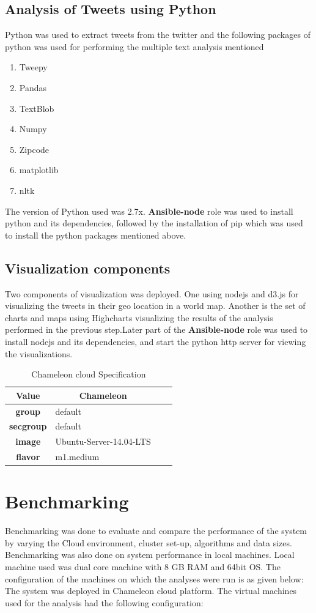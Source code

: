 \documentclass[9pt,twocolumn,twoside]{../../styles/osajnl}
\begin{document}
\subsection{Analysis of Tweets using Python}
Python was used to extract tweets from the twitter and the following packages of python was used for performing the multiple text analysis mentioned
\begin{enumerate}
    \item Tweepy
\item Pandas
\item TextBlob
\item Numpy
\item Zipcode
\item matplotlib
\item nltk
\end{enumerate}

The version of Python used was 2.7x. \textbf{Ansible-node} role was used to install python and its dependencies, followed by the installation of pip which was used to install the python packages mentioned above.
\subsection{Visualization components}
Two components of visualization was deployed. One using nodejs and d3.js for visualizing the tweets in their geo location in a world map. Another is the set of charts and maps using Highcharts visualizing the results of the analysis performed in the previous step.Later part of the \textbf{Ansible-node} role was used to install nodejs and its dependencies, and start the python http server for viewing the visualizations.  
\begin{table}[htb]
\centering
\caption{Chameleon cloud Specification}
\label{tab-cham}
\begin{tabular}{@{}clll@{}}
\toprule
\textbf{Value}    & \multicolumn{1}{c}{\textbf{Chameleon}} \\ \midrule
\textbf{group}    & default         \\
\textbf{secgroup} & default  \\
\textbf{image}    & Ubuntu-Server-14.04-LTS\\
\textbf{flavor}   & m1.medium    \\ \bottomrule
\end{tabular}
\end{table}
\section{Benchmarking}
Benchmarking was done to evaluate and compare the performance of the system by varying the Cloud environment, cluster set-up, algorithms and data sizes. Benchmarking was also done on system performance in local machines. Local machine used was dual core machine with 8 GB RAM and 64bit OS. The configuration of the machines on which the analyses were run is as given below:
The system was deployed in Chameleon cloud platform. The virtual machines used for the analysis had the following configuration:\\  
\end{document}
